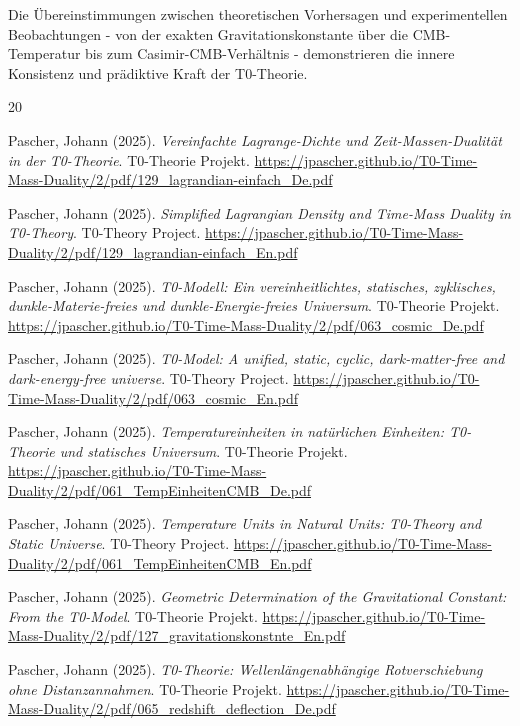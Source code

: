 	Die Übereinstimmungen zwischen theoretischen Vorhersagen und experimentellen Beobachtungen - von der exakten Gravitationskonstante über die CMB-Temperatur bis zum Casimir-CMB-Verhältnis - demonstrieren die innere Konsistenz und prädiktive Kraft der T0-Theorie.
	

	
	\begin{thebibliography}{20}
		
		Pascher, Johann (2025). 
		\textit{Vereinfachte Lagrange-Dichte und Zeit-Massen-Dualität in der T0-Theorie}. 
		T0-Theorie Projekt. 
		\url{https://jpascher.github.io/T0-Time-Mass-Duality/2/pdf/129_lagrandian-einfach_De.pdf}
		
		Pascher, Johann (2025). 
		\textit{Simplified Lagrangian Density and Time-Mass Duality in T0-Theory}. 
		T0-Theory Project. 
		\url{https://jpascher.github.io/T0-Time-Mass-Duality/2/pdf/129_lagrandian-einfach_En.pdf}
		
		Pascher, Johann (2025). 
		\textit{T0-Modell: Ein vereinheitlichtes, statisches, zyklisches, dunkle-Materie-freies und dunkle-Energie-freies Universum}. 
		T0-Theorie Projekt. 
		\url{https://jpascher.github.io/T0-Time-Mass-Duality/2/pdf/063_cosmic_De.pdf}
		
		Pascher, Johann (2025). 
		\textit{T0-Model: A unified, static, cyclic, dark-matter-free and dark-energy-free universe}. 
		T0-Theory Project. 
		\url{https://jpascher.github.io/T0-Time-Mass-Duality/2/pdf/063_cosmic_En.pdf}
		
		Pascher, Johann (2025). 
		\textit{Temperatureinheiten in natürlichen Einheiten: T0-Theorie und statisches Universum}. 
		T0-Theorie Projekt. 
		\url{https://jpascher.github.io/T0-Time-Mass-Duality/2/pdf/061_TempEinheitenCMB_De.pdf}
		
		Pascher, Johann (2025). 
		\textit{Temperature Units in Natural Units: T0-Theory and Static Universe}. 
		T0-Theory Project. 
		\url{https://jpascher.github.io/T0-Time-Mass-Duality/2/pdf/061_TempEinheitenCMB_En.pdf}
		
		Pascher, Johann (2025). 
		\textit{Geometric Determination of the Gravitational Constant: From the T0-Model}. 
		T0-Theorie Projekt. 
		\url{https://jpascher.github.io/T0-Time-Mass-Duality/2/pdf/127_gravitationskonstnte_En.pdf}
		
		Pascher, Johann (2025). 
		\textit{T0-Theorie: Wellenlängenabhängige Rotverschiebung ohne Distanzannahmen}. 
		T0-Theorie Projekt. 
		\url{https://jpascher.github.io/T0-Time-Mass-Duality/2/pdf/065_redshift_deflection_De.pdf}
		

\end{thebibliography}
